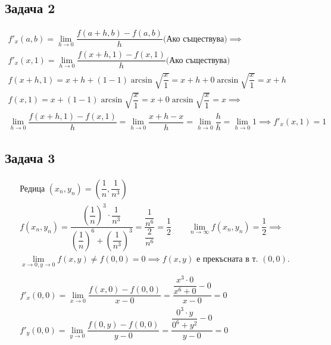 \documentclass[a4paper,fleqn,12pt]{article}
\theoremstyle{definition}
\begin{document}
\subsection*{Задача 2}
\begin{gather*}
f'_x (a,b) = \lim\limits_{h \to 0} \dfrac{f(a +h,b) - f(a,b)}{h} \text{(Ако съществува)} \implies \\
f'_x(x,1) =  \lim\limits_{h \to 0} \dfrac{f(x +h,1) - f(x,1)}{h} \text{(Ако съществува)}\\
f(x +h,1) = x + h + (1-1)\arcsin{\sqrt{\dfrac{x}{1}}} = x + h + 0 \arcsin{\sqrt{\dfrac{x}{1}}} =  x + h \\
f(x,1) = x + (1-1)\arcsin{\sqrt{\dfrac{x}{1}}} = x + 0 \arcsin{\sqrt{\dfrac{x}{1}}} =  x \implies \\
\lim\limits_{h \to 0} \dfrac{f(x +h,1) - f(x,1)}{h} =  \lim\limits_{h \to 0} \dfrac{x + h - x}{h} = \lim\limits_{h \to 0} \dfrac{h}{h} =  \lim\limits_{h \to 0} 1 \implies f'_x(x,1) = 1
\end{gather*}

\subsection*{Задача 3}

\begin{gather*}
\text{Редица } (x_n, y_n) = \left(\dfrac{1}{n}, \dfrac{1}{n^3} \right) \\
f(x_n, y_n) = \dfrac{ \left( \dfrac{1}{n} \right)^3 \cdot \dfrac{1}{n^3}}{\left( \dfrac{1}{n}\right)^6 + \left( \dfrac{1}{n^3} \right)^3 } = \dfrac{\dfrac{1}{n^6}}{\dfrac{2}{n^6}} = \dfrac{1}{2} \qquad \lim\limits_{n \to \infty} f(x_n, y_n) = \dfrac{1}{2}  \implies \\
\lim\limits_{x \to 0, y \to 0 } f(x, y) \neq f(0,0) = 0 \implies f(x, y) \text{ е прекъсната в т. }(0,0).\\
\\
f'_x (0,0) = \lim\limits_{x \to 0} \dfrac{f(x,0) - f(0,0)}{x - 0} = \dfrac{ \dfrac{x^3 \cdot 0}{x^6 + 0} - 0}{x - 0} = 0 \\
f'_y (0,0) = \lim\limits_{y \to 0} \dfrac{f(0,y) - f(0,0)}{y - 0} = \dfrac{\dfrac{0^3 \cdot y}{0^6 + y^2} - 0}{y - 0} = 0
\end{gather*}
\end{document}
